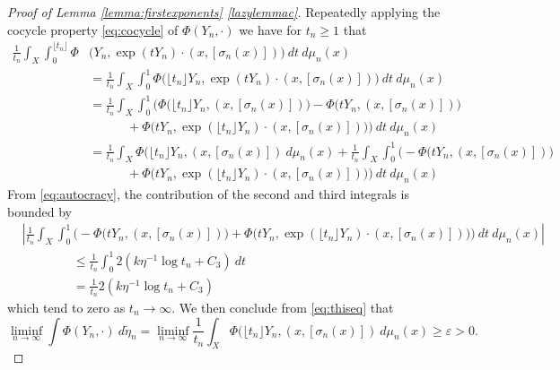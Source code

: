 \documentclass[10pt,reqno]{amsart}
\theoremstyle{Theorem}
\theoremstyle{definition}
\theoremstyle{remark}
\renewcommand{\epsilon}{\varepsilon}
\newcommand{\td}{\tilde}
\newcommand{\inv}{^{-1}}
\begin{document}
\begin{proof}[Proof of Lemma \ref{lemma:firstexponents} \ref{lazylemmac}]
 Repeatedly applying the cocycle property \eqref{eq:cocycle} of $\Phi(Y_n, \cdot)$ we have  for $t_n\ge 1$ that
\begin{align*}
  \frac{1}{t_n}  \int_X  \int_0^{\lfloor t_n\rfloor} \Phi  & \big(Y_n,\exp (tY_n) \cdot (x,  [\sigma_n(x)] )\big ) \ d t \ d \mu_n(x)
  \\&= \frac{1}{t_n} \int_X  \int_0^{1}   \Phi    \big({\lfloor t_n\rfloor} Y_n, \exp (tY_n) \cdot (x,  [\sigma_n(x)] )\big ) \ d t\ d \mu_n(x)
  \\&= \frac{1}{t_n}  \int_X \int_0^{1}  \Big( \Phi    \big({\lfloor t_n\rfloor} Y_n,  (x,  [\sigma_n(x)] )\big )
  -  \Phi    \big( t Y_n,  (x,  [\sigma_n(x)] )\big )
  \\ & \quad\quad\quad +     \Phi    \big( t Y_n, \exp (\lfloor t_n\rfloor Y_n)\cdot  (x,  [\sigma_n(x)] )\big )
  \Big)
   \ d t\ d \mu_n(x)
   \\& =  \frac{1}{t_n}   \int_X \Phi    \big({\lfloor t_n\rfloor} Y_n,  (x,  [\sigma_n(x)] )  \ d \mu_n(x) +
 \frac{1}{t_n} \int_X \int_0^{1}  \Big(    -  \Phi    \big( t Y_n,  (x,  [\sigma_n(x)] )\big )   \\ & \quad\quad\quad +      \Phi    \big( t Y_n, \exp (\lfloor t_n\rfloor Y_n)\cdot  (x,  [\sigma_n(x)] )\big )
  \Big) \ dt\ d \mu_n(x)
%
%
\end{align*}
From \eqref{eq:autocracy}, the contribution of the second and third integrals is bounded by
\begin{align*}
 &\left|\frac{1}{t_n}\int_X  \int_0^{1}  \Big(    -  \Phi    \big( t Y_n,  (x,  [\sigma_n(x)] )\big )
      +     \Phi    \big( t Y_n, \exp (\lfloor t_n\rfloor Y_n)\cdot  (x,  [\sigma_n(x)] )\big )
  \Big)  \ d t  \ d \mu_n(x)
 \right|
 \\&\quad \quad \quad \quad \le \frac{1}{t_n}  \int_0^{1}  2 ( k  \eta\inv \log t_n +  C_3)\ dt
 \\&\quad \quad \quad \quad = \frac{1}{t_n}    2 ( k  \eta\inv \log t_n +  C_3)
\end{align*}
which tend to zero as $t_n\to \infty$.  We then conclude from \eqref{eq:thiseq} that
\begin{equation}
\label{eq:keyless}
\liminf_{n\to \infty} \int \Phi   (Y_n, \cdot ) \ d \td \eta_n = \liminf_{n\to \infty}    \frac{1}{t_n} \int_X    \Phi    \big({\lfloor t_n\rfloor} Y_n,  (x,  [\sigma_n(x)] ) \ d \mu_n(x)
\ge \epsilon >0.
\end{equation}


\end{proof}
\end{document}

